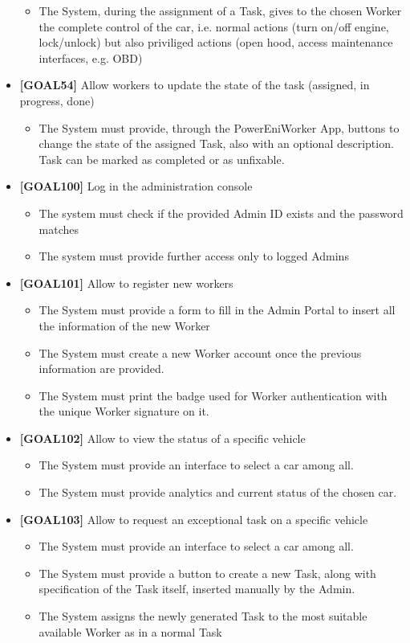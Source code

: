 \begin{itemize}
	\begin{itemize}
	\item The System, during the assignment of a Task, gives to the chosen Worker the complete control of the car, i.e. normal actions (turn on/off engine, lock/unlock) but also priviliged actions (open hood, access maintenance interfaces, e.g. OBD)
	\end{itemize}
\item \textbf{[GOAL54]} Allow workers to update the state of the task (assigned, in progress, done)
	\begin{itemize}
	\item The System must provide, through the PowerEniWorker App, buttons to change the state of the assigned Task, also with an optional description. Task can be marked  as completed or as unfixable.
	\end{itemize}
\item \textbf{[GOAL100]} Log in the administration console
	\begin{itemize}
	\item The system must check if the provided Admin ID exists and the password matches
	\item The system must provide further access only to logged Admins
	\end{itemize}
\item \textbf{[GOAL101]} Allow to register new workers
	\begin{itemize}
	\item The System must provide a form to fill in the Admin Portal to insert all the information of the new Worker
	\item The System must create a new Worker account once the previous information are provided.
	\item The System must print the badge used for Worker authentication with the unique Worker signature on it.
	\end{itemize}
\item \textbf{[GOAL102]} Allow to view the status of a specific vehicle
	\begin{itemize}
	\item The System must provide an interface to select a car among all.
	\item The System must provide analytics and current status of the chosen car.
	\end{itemize}
\item \textbf{[GOAL103]} Allow to request an exceptional task on a specific vehicle
	\begin{itemize}
	\item The System must provide an interface to select a car among all.
	\item The System must provide a button to create a new Task, along with specification of the Task itself, inserted manually by the Admin.
	\item The System assigns the newly generated Task to the most suitable available Worker as in a normal Task
	\end{itemize}
\end{itemize}



